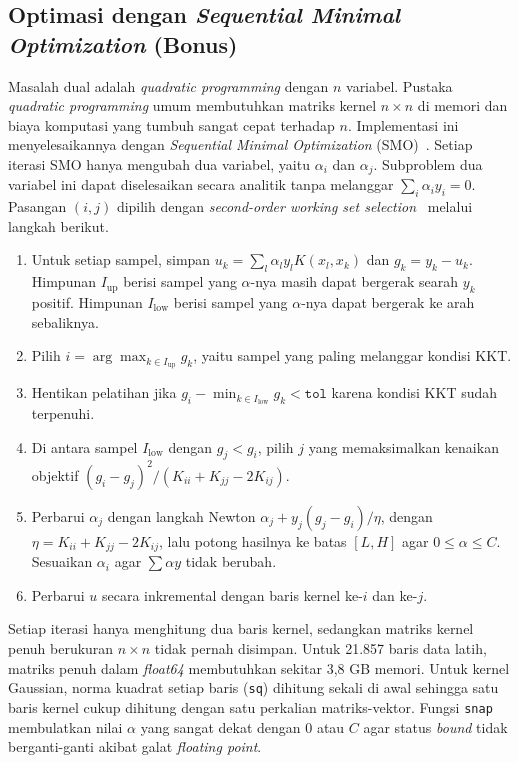 \subsection{Optimasi dengan \textit{Sequential Minimal Optimization} (Bonus)}

Masalah dual adalah \textit{quadratic programming} dengan $n$ variabel. Pustaka
\textit{quadratic programming} umum membutuhkan matriks kernel $n\times n$ di
memori dan biaya komputasi yang tumbuh sangat cepat terhadap $n$. Implementasi
ini menyelesaikannya dengan \textit{Sequential Minimal Optimization}
(SMO)~\cite{platt1998smo}. Setiap iterasi SMO hanya mengubah dua variabel, yaitu
$\alpha_i$ dan $\alpha_j$. Subproblem dua variabel ini dapat diselesaikan secara
analitik tanpa melanggar $\sum_i\alpha_i y_i=0$. Pasangan $(i,j)$ dipilih dengan
\textit{second-order working set selection}~\cite{fan2005wss} melalui langkah
berikut.
\begin{enumerate}
	\item Untuk setiap sampel, simpan $u_k=\sum_l\alpha_l y_l K(x_l,x_k)$ dan
	$g_k=y_k-u_k$. Himpunan $I_{\text{up}}$ berisi sampel yang $\alpha$-nya masih
	dapat bergerak searah $y_k$ positif. Himpunan $I_{\text{low}}$ berisi sampel
	yang $\alpha$-nya dapat bergerak ke arah sebaliknya.
	\item Pilih $i=\arg\max_{k\in I_{\text{up}}} g_k$, yaitu sampel yang paling
	melanggar kondisi KKT.
	\item Hentikan pelatihan jika $g_i-\min_{k\in I_{\text{low}}}g_k<\texttt{tol}$
	karena kondisi KKT sudah terpenuhi.
	\item Di antara sampel $I_{\text{low}}$ dengan $g_j<g_i$, pilih $j$ yang
	memaksimalkan kenaikan objektif $(g_i-g_j)^2/(K_{ii}+K_{jj}-2K_{ij})$.
	\item Perbarui $\alpha_j$ dengan langkah Newton
	$\alpha_j+y_j(g_j-g_i)/\eta$, dengan $\eta=K_{ii}+K_{jj}-2K_{ij}$, lalu potong
	hasilnya ke batas $[L,H]$ agar $0\le\alpha\le C$. Sesuaikan $\alpha_i$ agar
	$\sum\alpha y$ tidak berubah.
	\item Perbarui $u$ secara inkremental dengan baris kernel ke-$i$ dan ke-$j$.
\end{enumerate}
Setiap iterasi hanya menghitung dua baris kernel, sedangkan matriks kernel penuh
berukuran $n\times n$ tidak pernah disimpan. Untuk 21.857 baris data latih, matriks
penuh dalam \textit{float64} membutuhkan sekitar 3,8 GB memori. Untuk kernel
Gaussian, norma kuadrat setiap baris (\texttt{sq}) dihitung sekali di awal
sehingga satu baris kernel cukup dihitung dengan satu perkalian matriks-vektor.
Fungsi \texttt{snap} membulatkan nilai $\alpha$ yang sangat dekat dengan 0 atau
$C$ agar status \textit{bound} tidak berganti-ganti akibat galat
\textit{floating point}.

